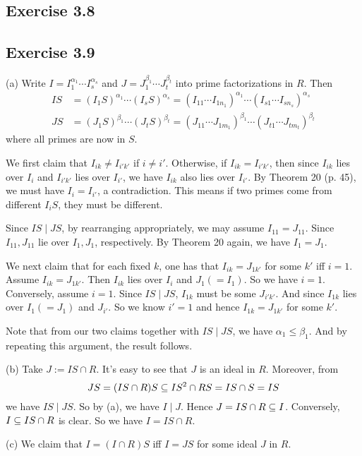 \documentclass[../Marcus.tex]{subfiles}
\begin{document}
\subsection*{Exercise 3.8}

\subsection*{Exercise 3.9}

(a) Write $I=I_1^{\alpha_1}\cdots I_s^{\alpha_s}$ and $J=J_1^{\beta_1}\cdots J_t^{\beta_t}$ into prime factorizations in $R$. Then
\begin{align*}
    IS &= (I_1S)^{\alpha_1}\cdots (I_sS)^{\alpha_s}=(I_{11}\cdots I_{1n_1})^{\alpha_1}\cdots (I_{s1}\cdots I_{sn_s})^{\alpha_s} \\
    JS &= (J_1S)^{\beta_1}\cdots (J_tS)^{\beta_t}=(J_{11}\cdots J_{1m_1})^{\beta_1}\cdots (J_{t1}\cdots J_{tm_t})^{\beta_t}
\end{align*}
where all primes are now in $S$.

We first claim that $I_{ik}\neq I_{i'k'}$ if $i\neq i'$. Otherwise, if $I_{ik}=I_{i'k'}$, then since $I_{ik}$ lies over $I_i$ and $I_{i'k'}$ lies over $I_{i'}$, we have $I_{ik}$ also lies over $I_{i'}$. By Theorem 20 (p. 45), we must have $I_i=I_{i'}$, a contradiction. This means if two primes come from different $I_iS$, they must be different.

Since $IS\mid JS$, by rearranging appropriately, we may assume $I_{11}=J_{11}$. Since $I_{11},J_{11}$ lie over $I_1,J_1$, respectively. By Theorem 20 again, we have $I_1=J_1$.

We next claim that for each fixed $k$, one has that $I_{ik}=J_{1k'}$ for some $k'$ iff $i=1$. Assume $I_{ik}=J_{1k'}$. Then $I_{ik}$ lies over $I_i$ and $J_1(=I_1)$. So we have $i=1$. Conversely, assume $i=1$. Since $IS\mid JS$, $I_{1k}$ must be some $J_{i'k'}$. And since $I_{1k}$ lies over $I_1(=J_1)$ and $J_{i'}$. So we know $i'=1$ and hence $I_{1k}=J_{1k'}$ for some $k'$.

Note that from our two claims together with $IS\mid JS$, we have $\alpha_1\leq \beta_1$. And by repeating this argument, the result follows.

(b) Take $J:=IS\cap R$. It's easy to see that $J$ is an ideal in $R$. Moreover, from $$JS = (IS\cap R)S \subseteq IS^2\cap RS = IS\cap S = IS$$ we have $IS\mid JS$. So by (a), we have $I\mid J$. Hence $J=IS\cap R\subseteq I$. Conversely, $I\subseteq IS\cap R$ is clear. So we have $I=IS\cap R$.

(c) We claim that $I=(I\cap R)S$ iff $I=JS$ for some ideal $J$ in $R$.
\end{document}
